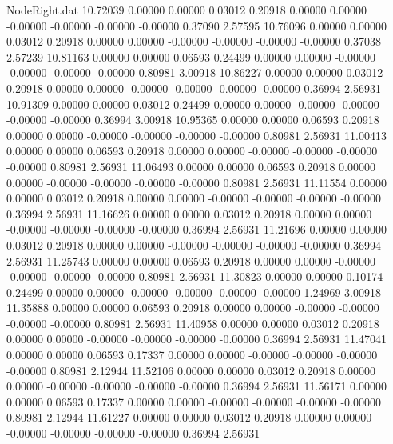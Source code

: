 \begin{filecontents}{NodeRight.dat}
  10.72039    0.00000    0.00000     0.03012    0.20918    0.00000    0.00000   -0.00000   -0.00000   -0.00000   -0.00000    0.37090    2.57595
  10.76096    0.00000    0.00000     0.03012    0.20918    0.00000    0.00000   -0.00000   -0.00000   -0.00000   -0.00000    0.37038    2.57239
  10.81163    0.00000    0.00000     0.06593    0.24499    0.00000    0.00000   -0.00000   -0.00000   -0.00000   -0.00000    0.80981    3.00918
  10.86227    0.00000    0.00000     0.03012    0.20918    0.00000    0.00000   -0.00000   -0.00000   -0.00000   -0.00000    0.36994    2.56931
  10.91309    0.00000    0.00000     0.03012    0.24499    0.00000    0.00000   -0.00000   -0.00000   -0.00000   -0.00000    0.36994    3.00918
  10.95365    0.00000    0.00000     0.06593    0.20918    0.00000    0.00000   -0.00000   -0.00000   -0.00000   -0.00000    0.80981    2.56931
  11.00413    0.00000    0.00000     0.06593    0.20918    0.00000    0.00000   -0.00000   -0.00000   -0.00000   -0.00000    0.80981    2.56931
  11.06493    0.00000    0.00000     0.06593    0.20918    0.00000    0.00000   -0.00000   -0.00000   -0.00000   -0.00000    0.80981    2.56931
  11.11554    0.00000    0.00000     0.03012    0.20918    0.00000    0.00000   -0.00000   -0.00000   -0.00000   -0.00000    0.36994    2.56931
  11.16626    0.00000    0.00000     0.03012    0.20918    0.00000    0.00000   -0.00000   -0.00000   -0.00000   -0.00000    0.36994    2.56931
  11.21696    0.00000    0.00000     0.03012    0.20918    0.00000    0.00000   -0.00000   -0.00000   -0.00000   -0.00000    0.36994    2.56931
  11.25743    0.00000    0.00000     0.06593    0.20918    0.00000    0.00000   -0.00000   -0.00000   -0.00000   -0.00000    0.80981    2.56931
  11.30823    0.00000    0.00000     0.10174    0.24499    0.00000    0.00000   -0.00000   -0.00000   -0.00000   -0.00000    1.24969    3.00918
  11.35888    0.00000    0.00000     0.06593    0.20918    0.00000    0.00000   -0.00000   -0.00000   -0.00000   -0.00000    0.80981    2.56931
  11.40958    0.00000    0.00000     0.03012    0.20918    0.00000    0.00000   -0.00000   -0.00000   -0.00000   -0.00000    0.36994    2.56931
  11.47041    0.00000    0.00000     0.06593    0.17337    0.00000    0.00000   -0.00000   -0.00000   -0.00000   -0.00000    0.80981    2.12944
  11.52106    0.00000    0.00000     0.03012    0.20918    0.00000    0.00000   -0.00000   -0.00000   -0.00000   -0.00000    0.36994    2.56931
  11.56171    0.00000    0.00000     0.06593    0.17337    0.00000    0.00000   -0.00000   -0.00000   -0.00000   -0.00000    0.80981    2.12944
  11.61227    0.00000    0.00000     0.03012    0.20918    0.00000    0.00000   -0.00000   -0.00000   -0.00000   -0.00000    0.36994    2.56931

\end{filecontents}
